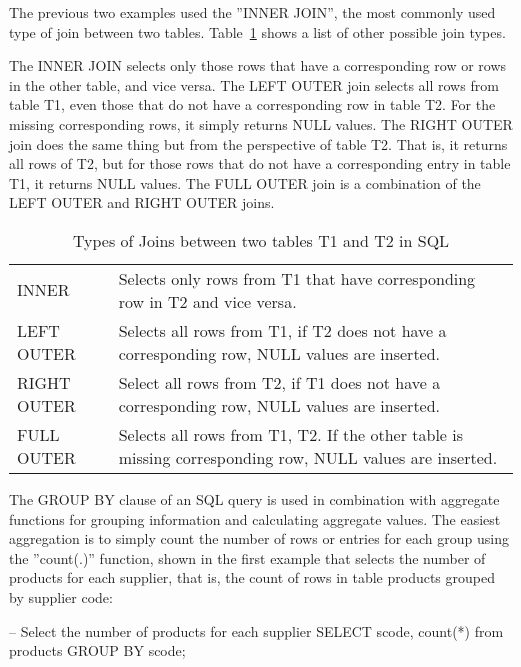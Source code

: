 The previous two examples used the ''INNER JOIN'', the most commonly used type of join between two tables. Table~\ref{tab:sqljoins} shows a list of other possible join types. 

The INNER JOIN selects only those rows that have a corresponding row or rows in the other table, and vice versa. The LEFT OUTER join selects all rows from table T1, even those that do not have a corresponding row in table T2. For the missing corresponding rows, it simply returns NULL values. The RIGHT OUTER join does the same thing but from the perspective of table T2. That is, it returns all rows of T2, but for those rows that do not have a corresponding entry in table T1, it returns NULL values. The FULL OUTER join is a combination of the LEFT OUTER and RIGHT OUTER joins.

\begin{table}
\centering

\renewcommand{\arraystretch}{1.5}
\small
\begin{tabularx}{.8\textwidth}{l|X} \hline
INNER & Selects only rows from T1 that have corresponding row in T2 and vice versa. \\
LEFT OUTER & Selects all rows from T1, if T2 does not have a corresponding row, NULL values are inserted. \\
RIGHT OUTER & Select all rows from T2, if T1 does not have a corresponding row, NULL values are inserted. \\
FULL OUTER & Selects all rows from T1, T2. If the other table is missing corresponding row, NULL values are inserted. \\ \hline
\end{tabularx}

\caption{Types of Joins between two tables T1 and T2 in SQL}
\label{tab:sqljoins}
\end{table}

The GROUP BY clause of an SQL query is used in combination with aggregate functions for grouping information and calculating aggregate values. The easiest aggregation is to simply count the number of rows or entries for each group using the ''count(.)'' function, shown in the first example that selects the number of products for each supplier, that is, the count of rows in table products grouped by supplier code:

\begin{sqlcode}
-- Select the number of products for each supplier
SELECT scode, count(*) from products GROUP BY scode;
\end{sqlcode}

